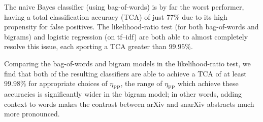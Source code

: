 \documentclass[paperwidth=40in,paperheight=32in,margin=1in,fontscale=0.33]{baposter}
\begin{document}
\begin{poster}
{The naive Bayes classifier (using bag-of-words) is by far the worst performer, having a total classification accuracy (TCA) of just 77\% due to its high propensity for false positives.
The likelihood-ratio test (for both bag-of-words and bigrams) and logistic regression (on tf--idf) are both able to almost completely resolve this issue, each sporting a TCA greater than $99.95\%$.

Comparing the bag-of-words and bigram models in the likelihood-ratio test, we find that both of the resulting classifiers are able to achieve a TCA of at least $99.98\%$ for appropriate choices of $\eta_\text{PP}$, the range of $\eta_\text{PP}$ which achieve these accuracies is significantly wider in the bigram model; in other words, adding context to words makes the contrast between arXiv and snarXiv abstracts much more pronounced.
}
\setlength{\fboxsep}{1mm}



	





% 	
% 	

\end{poster}
\end{document}
